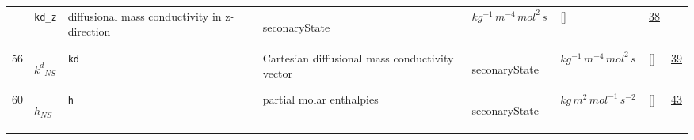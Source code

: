 \begin{longtable}{|p{1cm}|p{3cm}|p{3cm}|p{7cm}|p{3.0cm}|p{3cm}|p{2cm}|p{1cm}|}
             & \verb|kd_z|
             & diffusional mass conductivity in z-direction
             & \begin{lay}seconaryState \end{lay}
             & $ kg^{-1} \,m^{-4} \,mol^{2} \,s \, $
             & []
             & \hyperlink{"e:38"}{ 38 }
                 \\
    56
             & \hypertarget{"v:56"}{ $ {k^{d}}{_{{N S}}} $}
             & \verb|kd|
             & Cartesian diffusional mass conductivity vector
             & \begin{lay}seconaryState \end{lay}
             & $ kg^{-1} \,m^{-4} \,mol^{2} \,s \, $
             & []
             & \hyperlink{"e:39"}{ 39 }
                 \\
    60
             & \hypertarget{"v:60"}{ $ {h}{_{{N S}}} $}
             & \verb|h|
             & partial molar enthalpies
             & \begin{lay}seconaryState \end{lay}
             & $ kg \,m^{2} \,mol^{-1} \,s^{-2} \, $
             & []
             & \hyperlink{"e:43"}{ 43 }
                 \\
    \end{longtable}